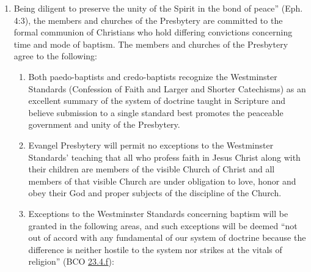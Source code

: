 \documentclass[
]{book}
\providecommand{\tightlist}{%
  \setlength{\itemsep}{0pt}\setlength{\parskip}{0pt}}
\begin{document}
\begin{enumerate}
\def\labelenumi{\arabic{enumi}.}
\tightlist
\item
  \protect\hypertarget{16}{\href{}{}}Being diligent to preserve the unity of the Spirit in the bond of peace'' (Eph. 4:3), the members and churches of the Presbytery are committed to the formal communion of Christians who hold differing convictions concerning time and mode of baptism. The members and churches of the Presbytery agree to the following:

  \begin{enumerate}
  \def\labelenumii{\alph{enumii}.}
  \tightlist
  \item
    Both paedo-baptists and credo-baptists recognize the Westminster Standards (Confession of Faith and Larger and Shorter Catechisms) as an excellent summary of the system of doctrine taught in Scripture and believe submission to a single standard best promotes the peaceable government and unity of the Presbytery.
  \item
    Evangel Presbytery will permit no exceptions to the Westminster Standards' teaching that all who profess faith in Jesus Christ along with their children are members of the visible Church of Christ and all members of that visible Church are under obligation to love, honor and obey their God and proper subjects of the discipline of the Church.
  \item
    Exceptions to the Westminster Standards concerning baptism will be granted in the following areas, and such exceptions will be deemed ``not out of accord with any fundamental of our system of doctrine because the difference is neither hostile to the system nor strikes at the vitals of religion'' (BCO \protect\hyperlink{23.4.f}{23.4.f}):


\end{enumerate}
\end{enumerate}
\end{document}
